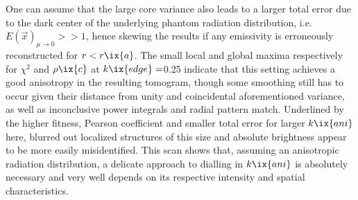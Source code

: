                 One can assume that the large core variance also leads to a larger total error due to the dark center of the underlying phantom radiation distribution, i.e. $E\left(\vec{x}\right)_{\mu\rightarrow0}>>1$, hence skewing the results if any emissivity is erroneously reconstructed for $r<r\ix{a}$. The small local and global maxima respectively for $\chi^{2}$ and $\rho\ix{c}$ at $k\ix{edge}=$\SI{0.25}{\arbitraryunit} indicate that this setting achieves a good anisotropy in the resulting tomogram, though some smoothing still has to occur given their distance from unity and coincidental aforementioned variance, as well as inconclusive power integrals and radial pattern match. Underlined by the higher fitness, Pearson coefficient and smaller total error for larger $k\ix{ani}$ here, blurred out localized structures of this size and absolute brightness appear to be more easily misidentified. This scan shows that, assuming an anisotropic radiation distribution, a delicate approach to dialling in $k\ix{ani}$ is absolutely necessary and very well depends on its respective intensity and spatial characteristics.%
%
